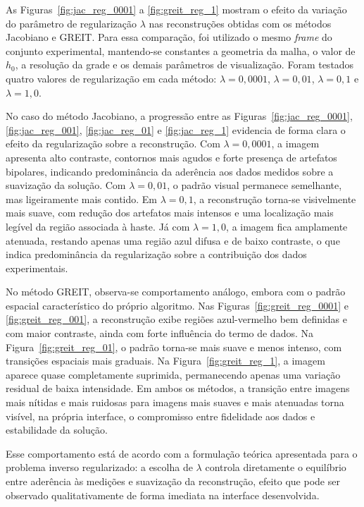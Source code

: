 As Figuras~\ref{fig:jac_reg_0001} a \ref{fig:greit_reg_1} mostram o efeito da variação do parâmetro de regularização \(\lambda\) nas reconstruções obtidas com os métodos Jacobiano e GREIT. Para essa comparação, foi utilizado o mesmo \textit{frame} do conjunto experimental, mantendo-se constantes a geometria da malha, o valor de \(h_0\), a resolução da grade e os demais parâmetros de visualização. Foram testados quatro valores de regularização em cada método: \(\lambda = 0{,}0001\), \(\lambda = 0{,}01\), \(\lambda = 0{,}1\) e \(\lambda = 1{,}0\).

No caso do método Jacobiano, a progressão entre as Figuras~\ref{fig:jac_reg_0001}, \ref{fig:jac_reg_001}, \ref{fig:jac_reg_01} e \ref{fig:jac_reg_1} evidencia de forma clara o efeito da regularização sobre a reconstrução. Com \(\lambda = 0{,}0001\), a imagem apresenta alto contraste, contornos mais agudos e forte presença de artefatos bipolares, indicando predominância da aderência aos dados medidos sobre a suavização da solução. Com \(\lambda = 0{,}01\), o padrão visual permanece semelhante, mas ligeiramente mais contido. Em \(\lambda = 0{,}1\), a reconstrução torna-se visivelmente mais suave, com redução dos artefatos mais intensos e uma localização mais legível da região associada à haste. Já com \(\lambda = 1{,}0\), a imagem fica amplamente atenuada, restando apenas uma região azul difusa e de baixo contraste, o que indica predominância da regularização sobre a contribuição dos dados experimentais.

No método GREIT, observa-se comportamento análogo, embora com o padrão espacial característico do próprio algoritmo. Nas Figuras~\ref{fig:greit_reg_0001} e \ref{fig:greit_reg_001}, a reconstrução exibe regiões azul-vermelho bem definidas e com maior contraste, ainda com forte influência do termo de dados. Na Figura~\ref{fig:greit_reg_01}, o padrão torna-se mais suave e menos intenso, com transições espaciais mais graduais. Na Figura~\ref{fig:greit_reg_1}, a imagem aparece quase completamente suprimida, permanecendo apenas uma variação residual de baixa intensidade. Em ambos os métodos, a transição entre imagens mais nítidas e mais ruidosas para imagens mais suaves e mais atenuadas torna visível, na própria interface, o compromisso entre fidelidade aos dados e estabilidade da solução.

Esse comportamento está de acordo com a formulação teórica apresentada para o problema inverso regularizado: a escolha de \(\lambda\) controla diretamente o equilíbrio entre aderência às medições e suavização da reconstrução, efeito que pode ser observado qualitativamente de forma imediata na interface desenvolvida.

